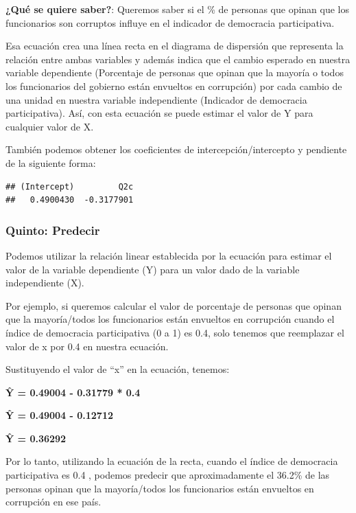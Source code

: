 \documentclass[
]{article}
\newenvironment{Shaded}{\begin{snugshade}}{\end{snugshade}}
\newcommand{\NormalTok}[1]{#1}
\newcommand{\SpecialCharTok}[1]{\textcolor[rgb]{0.81,0.36,0.00}{\textbf{#1}}}
\begin{document}
\textbf{¿Qué se quiere saber?}: Queremos saber si el \% de personas que
opinan que los funcionarios son corruptos influye en el indicador de
democracia participativa.

Esa ecuación crea una línea recta en el diagrama de dispersión que
representa la relación entre ambas variables y además indica que el
cambio esperado en nuestra variable dependiente (Porcentaje de personas
que opinan que la mayoría o todos los funcionarios del gobierno están
envueltos en corrupción) por cada cambio de una unidad en nuestra
variable independiente (Indicador de democracia participativa). Así, con
esta ecuación se puede estimar el valor de Y para cualquier valor de X.

También podemos obtener los coeficientes de intercepción/intercepto y
pendiente de la siguiente forma:

\begin{Shaded}
\end{Shaded}

\begin{verbatim}
## (Intercept)         Q2c 
##   0.4900430  -0.3177901
\end{verbatim}

\hypertarget{quinto-predecir}{%
\subsubsection{Quinto: Predecir}\label{quinto-predecir}}

Podemos utilizar la relación linear establecida por la ecuación para
estimar el valor de la variable dependiente (Y) para un valor dado de la
variable independiente (X).

Por ejemplo, si queremos calcular el valor de porcentaje de personas que
opinan que la mayoría/todos los funcionarios están envueltos en
corrupción cuando el índice de democracia participativa (0 a 1) es 0.4,
solo tenemos que reemplazar el valor de x por 0.4 en nuestra ecuación.

Sustituyendo el valor de ``x'' en la ecuación, tenemos:

\textbf{Ŷ = 0.49004 - 0.31779 * 0.4}

\textbf{Ŷ = 0.49004 - 0.12712}

\textbf{Ŷ = 0.36292}

Por lo tanto, utilizando la ecuación de la recta, cuando el índice de
democracia participativa es 0.4 , podemos predecir que aproximadamente
el 36.2\% de las personas opinan que la mayoría/todos los funcionarios
están envueltos en corrupción en ese país.
\end{document}
